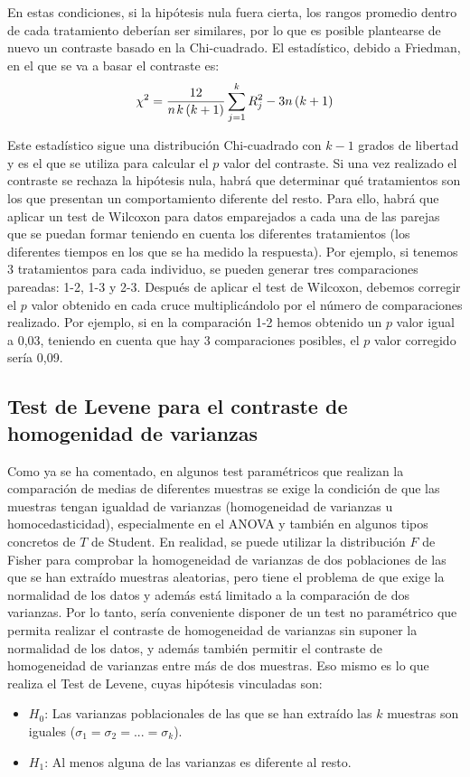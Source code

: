 En estas condiciones, si la hipótesis nula fuera cierta, los rangos promedio dentro de cada tratamiento deberían ser similares, por lo que
es posible plantearse de nuevo un contraste basado en la Chi-cuadrado. El estadístico, debido a Friedman, en el que se va a basar el
contraste es:
\[
\chi ^2  = \frac{{12}}{{n{\kern 1pt} k\left( {k + 1} \right)}}\sum\limits_{j = 1}^k {R_j ^2 }  - 3n\left( {k + 1} \right)
\]

Este estadístico sigue una distribución Chi-cuadrado con $k-1$ grados de libertad y es el que se utiliza para calcular el $p$ valor del
contraste. Si una vez realizado el contraste se rechaza la hipótesis nula, habrá que determinar qué tratamientos son los que presentan un
comportamiento diferente del resto. Para ello, habrá que aplicar un test de Wilcoxon para datos emparejados a cada una de las parejas que se
puedan formar teniendo en cuenta los diferentes tratamientos (los diferentes tiempos en los que se ha medido la respuesta). Por ejemplo, si
tenemos 3 tratamientos para cada individuo, se pueden generar tres comparaciones pareadas: 1-2, 1-3 y 2-3. Después de aplicar el test de
Wilcoxon, debemos corregir el $p$ valor obtenido en cada cruce multiplicándolo por el número de comparaciones realizado. Por ejemplo, si en
la comparación 1-2 hemos obtenido un $p$ valor igual a 0,03, teniendo en cuenta que hay 3 comparaciones posibles, el $p$ valor corregido
sería 0,09.


\subsection{Test de Levene para el contraste de homogenidad de varianzas}
Como ya se ha comentado, en algunos test paramétricos que realizan la comparación de medias de diferentes muestras se exige la condición de
que las muestras tengan igualdad de varianzas (homogeneidad de varianzas u homocedasticidad), especialmente en el ANOVA y también en algunos
tipos concretos de $T$ de Student. En realidad, se puede utilizar la distribución $F$ de Fisher para comprobar la homogeneidad de varianzas
de dos poblaciones de las que se han extraído muestras aleatorias, pero tiene el problema de que exige la normalidad de los datos y además
está limitado a la comparación de dos varianzas. Por lo tanto, sería conveniente disponer de un test no paramétrico que permita realizar el
contraste de homogeneidad de varianzas sin suponer la normalidad de los datos, y además también permitir el contraste de homogeneidad de
varianzas entre más de dos muestras. Eso mismo es lo que realiza el Test de Levene, cuyas hipótesis vinculadas son:
\begin{itemize}
\item $H_0$: Las varianzas poblacionales de las que se han extraído las $k$ muestras son iguales ($\sigma_1=\sigma_2=...=\sigma_k$).
\item $H_1$: Al menos alguna de las varianzas es diferente al resto.
\end{itemize}

